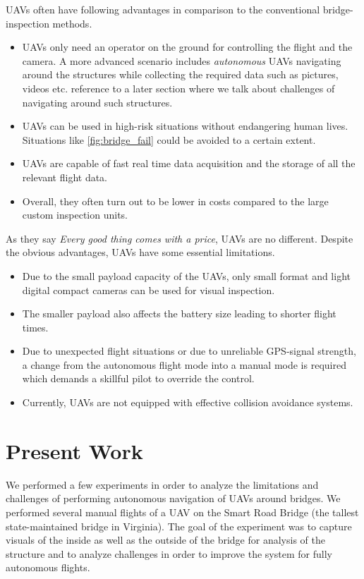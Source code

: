 \documentclass[12pt]{report}
\begin{document}
UAVs often have following advantages in comparison to the conventional bridge-inspection methods.
\begin{itemize}
\item  UAVs only need an operator on the ground for controlling the flight and the
camera. A more advanced scenario includes \textit{autonomous} UAVs navigating around the structures while collecting the required data such as pictures, videos etc. {\color{red} reference to a later section where we talk about challenges of navigating around such structures.}
\item UAVs can be used in high-risk situations without endangering human lives. Situations like \ref{fig:bridge_fail} could be avoided to a certain extent.
\item UAVs are capable of fast real time data acquisition and the storage of all the relevant flight data.
\item Overall, they often turn out to be lower in costs compared to the large custom inspection units.
\end{itemize}

As they say \textit{Every good thing comes with a price}, UAVs are no different. Despite the obvious advantages, UAVs have some essential limitations. 
\begin{itemize}
\item  Due to the small payload capacity of the UAVs, only small format and light digital compact cameras can be used for visual inspection. 
\item The smaller payload also affects the battery size leading to shorter flight times. 
\item Due to unexpected flight situations or due to unreliable GPS-signal strength, a change from the autonomous flight mode into a manual mode is required which demands a skillful pilot to override the control.
\item  Currently, UAVs are not equipped with effective collision avoidance systems. 
\end{itemize}

\section{Present Work}
We performed a few experiments in order to analyze the limitations and challenges of performing autonomous navigation of UAVs around bridges. We performed several manual flights of a UAV on the Smart Road Bridge (the tallest state-maintained bridge in Virginia). The goal of the experiment was to capture visuals of the inside as well as the outside of the bridge for analysis of the structure and to analyze challenges in order to improve the system for fully autonomous flights.
\end{document}

